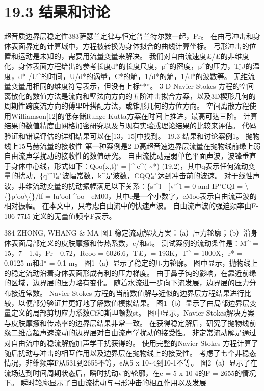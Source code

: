 \documentclass[UTF8,11pt,a4paper,openany,fontset=fandol]{ctexbook}
\begin{document}
\section{19.3 结果和讨论}
超音质边界层稳定性383萨瑟兰定律与恒定普兰特尔数一起，Pr。 在由弓冲击和身体表面界定的计算域中，方程被转换为身体拟合的曲线计算坐标。 弓形冲击的位置和运动是未知的，需要用流量变量来解决。 我们对自由流速度£/£的非维度化，身体表面方程给出的参考长度d*的长度尺度，p\textasciicircum{}的密度，p\textasciicircum{}的压力，TjJ的温度，d* /U\textasciicircum{}的时间，U/d*的涡量，C*的熵，1/d*的熵，1/d*的波数等。 无维流量变量用相同的维度符号表示，但没有上标“*”。 3-D Navier-Stokes 方程的空间离散化的数值方法是流向和壁法向方向的五阶冲击拟合方案，以及3D楔形几何的周期性跨度流方向的傅里叶搭配方法，或锥形几何的方位方向。 空间离散方程使用Williamson[12]的低存储Runge-Kutta方案在时间上推进，最高可达三阶。 计算结果的数值精度由网格加密研究以及与现有实验或理论结果的比较来评估。 代码验证和错误评估的详细结果可以在[13，15]中找到。 19.3 结果和讨论案例1。 抛物线上15马赫流量的接收性 第一种案例是2-D高超音速边界层流量在抛物线前缘上弱自由流声学扰动的接收性的数值研究。 自由流扰动是弱单色平面声波，波锋垂直于身体中心线，形式如下：Qoo(x,t)' = |\textasciicircum{}|e\textasciicircum{}(-\textasciitilde{}*) (19.2)，其中q表示任何流动变量的扰动，\{q'\textasciicircum{}l是波幅常数，k\textasciicircum{}是波数，CQQ是达到冲击前的波速。 对于线性声波，非维流动变量的扰动振幅满足以下关系：\{s'\textasciicircum{}l - [v'\textasciicircum{}l = 0 and IP'CQI = \textbackslash\{\}p'oo\textbackslash\{\}/lf = lu'ool-\textasciicircum{}oo - eM00，其中e是一个小数字，eMoo表示自由流声波的相对振幅。 在本文中，只考虑自由流中的快速声波。 自由流声波的强迫频率由F-106 77I5-定义的无量值频率F表示。

384 ZHONG, WHANG \& MA 图1 稳定流动解决方案：（a）压力轮廓；（b）沿身体表面局部定义的皮肤摩擦和传热系数，c/和st。 测试案例的流动条件是：M\textasciicircum{} = 15，7 - 1.4，Pr - 0.72，Reoo = 6026.6，T£，= 193K，T\textasciicircum{} = 1000X，r* = 0.0125 m和d* = 0.1 m。 图1（a）显示了稳定的压力轮廓。 图中显示，抛物线上的稳定流动沿着身体表面形成有利的压力梯度。 由于鼻子钝的影响，在靠近前缘的区域，边界层的压力略有变化。 随着水流进一步向下流发展，边界层的压力分布接近常数。 Navier-Stokes 方程的当前数值解与近似的边界层方程结果进行比较，以便部分验证并更好地了解数值模拟结果。 图1（b）显示了由局部边界层变量定义的局部剪切应力系数Cf和斯坦顿数st。 图中显示，Navier-Stokes解决方案与皮肤摩擦和传热率的边界层结果非常一致。 在获得稳定解后，研究了抛物线前缘二维高超声速流动的边界层对自由流声学扰动的接受性。 非定常流动解是通过对自由流中的稳流解施加声学干扰获得的。 使用完整的Navier-Stokes 方程计算了随后扰动与冲击的相互作用以及边界层在抛物线上的接受性。 考虑了七个非稳态情况，非维频率F从531到2655不等，e从5 x 10\textasciitilde{}4到10-1不等。 图2（a）显示了在流场达到时间周期状态后，瞬时扰动v'的轮廓，在e = 5 x 10-4的F = 2655的情况下。 瞬时轮廓显示了自由流扰动与弓形冲击的相互作用以及发展
\end{document}
